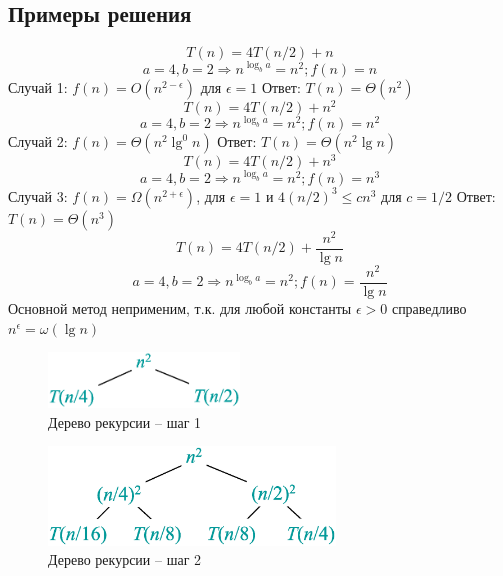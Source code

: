 \documentclass[a4paper,11pt]{article}
\begin{document}
\subsection{Примеры решения}
\begin{equation*}
  T(n) = 4T(n/2) + n
\end{equation*}
\begin{equation*}
  a = 4, b = 2 \Rightarrow n^{\log_b a} = n^2; f(n) = n
\end{equation*}
Случай 1: $f(n) = O(n^{2 - \epsilon})$ для $\epsilon = 1$
Ответ: $T(n) = \Theta(n^2)$
\begin{equation*}
  T(n) = 4T(n/2) + n^2
\end{equation*}
\begin{equation*}
  a = 4, b = 2 \Rightarrow n^{\log_b a} = n^2; f(n) = n^2
\end{equation*}
Случай 2: $f(n) = \Theta(n^2 \lg^0 n)$
Ответ: $T(n) = \Theta(n^2 \lg n)$
\begin{equation*}
  T(n) = 4T(n/2) + n^3
\end{equation*}
\begin{equation*}
  a = 4, b = 2 \Rightarrow n^{\log_b a} = n^2; f(n) = n^3
\end{equation*}
Случай 3: $f(n) = \Omega(n^{2 + \epsilon})$, для $\epsilon = 1$ и 
$4(n/2)^3 \leqslant c n^3$ для $c = 1/2$
Ответ: $T(n) = \Theta(n^3)$
\begin{equation*}
  T(n) = 4T(n/2) + \frac{n^2}{\lg n}
\end{equation*}
\begin{equation*}
  a = 4, b = 2 \Rightarrow n^{\log_b a} = n^2; f(n) = \frac{n^2}{\lg n}
\end{equation*}
Основной метод неприменим, т.к. для любой константы $\epsilon > 0$ справедливо
$n^{\epsilon} = \omega({\lg n})$

\pagebreak
\begin{figure}[p]
  \centering
  \includegraphics[width=2in]{lecture2/tree1.eps}
  \caption{Дерево рекурсии -- шаг 1}
  \label{fig:rectree1}
\end{figure}

\begin{figure}[p]
  \centering
  \includegraphics[width=3in]{lecture2/tree2.eps}
  \caption{Дерево рекурсии -- шаг 2}
  \label{fig:rectree2}
\end{figure}
\end{document}
